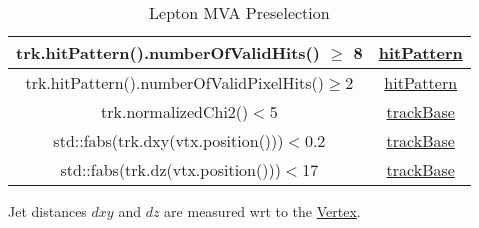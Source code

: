 \documentclass[11pt]{article}
\begin{document}
\begin{table}[H]
\begin{tabular}{c|c}
trk.hitPattern().numberOfValidHits() $\geq$ 8     & \href{https://github.com/cms-sw/cmssw/blob/bbac8f91da1cdddfbcb77c19b7ff519fadee878d/DataFormats/TrackReco/interface/HitPattern.h}{hitPattern}          \\ \hline
trk.hitPattern().numberOfValidPixelHits()$\geq$2  & \href{https://github.com/cms-sw/cmssw/blob/bbac8f91da1cdddfbcb77c19b7ff519fadee878d/DataFormats/TrackReco/interface/HitPattern.h}{hitPattern}          \\ \hline
trk.normalizedChi2()$<$5                          & \href{https://github.com/cms-sw/cmssw/blob/277cb56baa2e8187367f1897cdc3405c998ec2de/DataFormats/TrackReco/interface/TrackBase.h}{trackBase}       \\ \hline
std::fabs(trk.dxy(vtx.position()))$<$0.2          & \href{https://github.com/cms-sw/cmssw/blob/277cb56baa2e8187367f1897cdc3405c998ec2de/DataFormats/TrackReco/interface/TrackBase.h}{trackBase}          \\ \hline
std::fabs(trk.dz(vtx.position()))$<$17            & \href{https://github.com/cms-sw/cmssw/blob/277cb56baa2e8187367f1897cdc3405c998ec2de/DataFormats/TrackReco/interface/TrackBase.h}{trackBase}          
\end{tabular}
\caption{Lepton MVA Preselection}
\label{tab:leptonMVA_presel}
\end{table}

Jet distances $dxy$ and $dz$ are measured wrt to the \href{https://github.com/cms-sw/cmssw/blob/277cb56baa2e8187367f1897cdc3405c998ec2de/DataFormats/VertexReco/interface/Vertex.h}{Vertex}.
\end{document}
